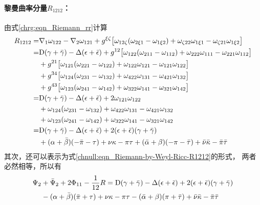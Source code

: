 \paragraph{黎曼曲率分量$R_{1212}$：}
由式\eqref{chrg:eqn_Riemann_rr}计算
\begin{align*}
    R_{1212} =& \nabla_{1}\omega_{122}
    -\nabla_{2} \omega_{121}
    + g^{\xi\zeta} \bigl[ \omega_{12\zeta} (\omega_{2\xi 1}
    -\omega_{1\xi 2}  ) + \omega _{\zeta 22} \omega _{1\xi 1}
    - \omega _{\zeta 21} \omega _{1\xi 2} \bigr] \\
    =& {\rm D}(\gamma + \bar{\gamma}) -{\Delta} (\epsilon+\bar{\epsilon})
    + g^{12} \bigl[ \omega_{122} (\omega_{211}
    -\omega_{112}  ) + \omega _{222} \omega _{111}
    - \omega _{221} \omega _{112} \bigr] \\
    &+ g^{21} \bigl[ \omega_{121} (\omega_{221}
    -\omega_{122}  ) + \omega _{122} \omega _{121}
    - \omega _{121} \omega _{122} \bigr] \\
    &+ g^{34} \bigl[ \omega_{124} (\omega_{231}
    -\omega_{132}  ) + \omega _{422} \omega _{131}
    - \omega _{421} \omega _{132} \bigr] \\
    &+ g^{43} \bigl[ \omega_{123} (\omega_{241}
    -\omega_{142}  ) + \omega _{322} \omega _{141}
    - \omega _{321} \omega _{142} \bigr] \\
    =& {\rm D}(\gamma + \bar{\gamma}) -{\Delta} (\epsilon+\bar{\epsilon})
    + 2\omega_{121}  \omega_{122} \\
    &+ \omega_{124} (\omega_{231} -\omega_{132}  )
    + \omega _{422} \omega _{131}
    - \omega _{421} \omega _{132}  \\
    &+ \omega_{123} (\omega_{241} -\omega_{142}  )
    + \omega _{322} \omega _{141}
    - \omega _{321} \omega _{142}  \\
    =& {\rm D}(\gamma + \bar{\gamma}) -{\Delta} (\epsilon+\bar{\epsilon})
    + 2(\epsilon+\bar{\epsilon}) (\gamma + \bar{\gamma}) \\
    &+ (\alpha+\bar{\beta}) (-\bar{\pi} -\tau  )   + \nu \kappa  - \pi \tau
    + (\bar{\alpha}+\beta) (-\pi -\bar{\tau}  )
    + \bar{\nu} \bar{\kappa} - \bar{\pi} \bar{\tau}
\end{align*}
其次，还可以表示为式\eqref{chnull:eqn_Riemann-by-Weyl-Ricc-R1212}的形式，
两者必然相等，所以有
\begin{equation}\label{chnull:eqn_npR1212}
    \begin{aligned}
        \Psi_{2} &+ \bar{\Psi}_2 + 2\Phi_{11} -\frac{1}{12}R =
        {\rm D}(\gamma + \bar{\gamma}) -{\Delta} (\epsilon+\bar{\epsilon})
        + 2(\epsilon+\bar{\epsilon}) (\gamma + \bar{\gamma}) \\
        &- (\alpha+\bar{\beta}) (\bar{\pi} +\tau  )   + \nu \kappa  - \pi \tau
        - (\bar{\alpha}+\beta) (\pi +\bar{\tau}  )
        + \bar{\nu} \bar{\kappa} - \bar{\pi} \bar{\tau}
    \end{aligned}
\end{equation}

